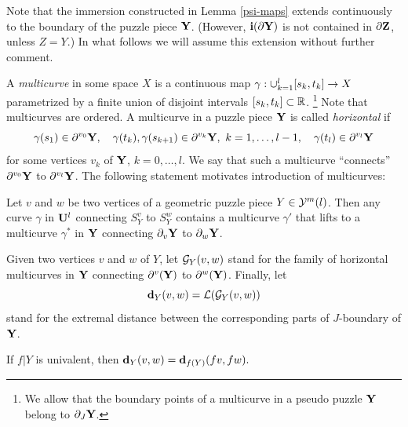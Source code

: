 Note that the immersion
constructed in Lemma \ref{psi-maps} extends continuously to the boundary of the
puzzle piece ${\mathbf{Y}}$.
(However, ${\mathbf{ i}}(\partial {\mathbf{Y}})$ is not contained in $\partial{\mathbf{Z}}$, unless $Z=Y$.)
In what follows we will assume this extension without further comment.


A {\it multicurve} in some space $X$ is a continuous map $\gamma: \cup_{k=1}^l [s_k, t_k]\rightarrow X$
parametrized by a finite union of disjoint intervals $[s_k, t_k]\subset {\Bbb R}$.%
\footnote{We allow that the boundary points of a  multicurve in a pseudo puzzle ${\mathbf{Y}}$ belong to  $\partial_J{\mathbf{Y}}$.}
Note that  multicurves are ordered.
A multicurve in a puzzle piece ${\mathbf{Y}}$  is called {\it horizontal} if
$$
   \gamma(s_1)\in \partial^{v_0} {\mathbf{Y}}, \quad  \gamma(t_k), \gamma(s_{k+1})\in \partial^{v_k}{\mathbf{Y}},\ k=1, \dots, l-1,
                  \quad \gamma(t_l)\in \partial^{v_l} {\mathbf{Y}}
$$
for some vertices $v_k$ of ${\mathbf{Y}}$, $k=0, \dots, l$. We say that such a multicurve ``connects''
$\partial^{v_0} {\mathbf{Y}} $ to $\partial^{v_l} {\mathbf{Y}}$.
The following statement motivates introduction of  multicurves:

\begin{lem}\label{lifts}
Let $v$ and $w$ be two vertices of a geometric puzzle piece $Y\in{\mathcal Y}^m(l)$.
Then any curve $\gamma$ in ${\mathbf{U}}^l$ connecting $S_Y^v$ to $S_Y^w$
contains a multicurve $\gamma'$  that lifts to a multicurve  $\gamma^*$ in ${\mathbf{Y}}$
connecting $\partial_v{\mathbf{Y}}$ to $\partial_w{\mathbf{Y}}$.
\end{lem}



Given two vertices $v$ and $w$ of $Y$, let ${\mathcal G}_Y(v,w)$ stand for the family of horizontal multicurves in ${\mathbf{Y}}$
connecting $\partial^v({\mathbf{Y}})$ to $\partial^w({\mathbf{Y}})$.
Finally, let
$$
         {\mathbf{d}}_Y(v,w)= {\mathcal L}({\mathcal G}_Y(v,w))
$$
stand for the extremal distance between the corresponding parts of $J$-boundary of ${\mathbf{Y}}$.

\begin{lem}\label{Bd}
  If  $f|Y$ is univalent,
then ${\mathbf{d}}_Y(v,w)={\mathbf{d}}_{f(Y)}(fv, fw). $
\end{lem}



